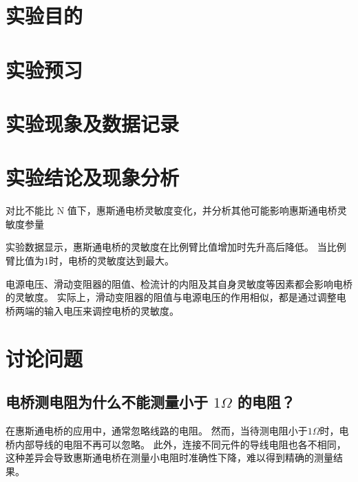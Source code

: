\documentclass[signature=data]{physicsreport}
\begin{document}
\maketitle
\section{实验目的}
\section{实验预习}
\newpage

\section{实验现象及数据记录}
\makeatletter
{}
\makeatother

\newpage



\section{实验结论及现象分析}
对比不能比 N 值下，惠斯通电桥灵敏度变化，并分析其他可能影响惠斯通电桥灵敏度参量


实验数据显示，惠斯通电桥的灵敏度在比例臂比值增加时先升高后降低。
当比例臂比值为1时，电桥的灵敏度达到最大。

电源电压、滑动变阻器的阻值、检流计的内阻及其自身灵敏度等因素都会影响电桥的灵敏度。
实际上，滑动变阻器的阻值与电源电压的作用相似，都是通过调整电桥两端的输入电压来调控电桥的灵敏度。

\section{讨论问题}

\subsection{电桥测电阻为什么不能测量小于 $1\Omega$ 的电阻？}

在惠斯通电桥的应用中，通常忽略线路的电阻。
然而，当待测电阻小于$1\Omega$时，电桥内部导线的电阻不再可以忽略。
此外，连接不同元件的导线电阻也各不相同，这种差异会导致惠斯通电桥在测量小电阻时准确性下降，难以得到精确的测量结果。
\end{document}
